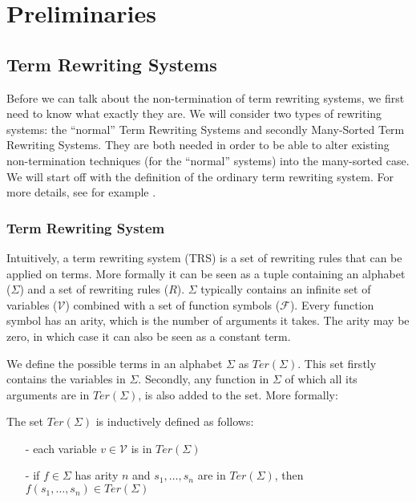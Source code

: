 \chapter{Preliminaries}\label{preliminaries}
\section{Term Rewriting Systems}
Before we can talk about the non-termination of term rewriting systems, we first need to know what exactly they are. We will consider two types of rewriting systems: the ``normal'' Term Rewriting Systems and secondly Many-Sorted Term Rewriting Systems. They are both needed in order to be able to alter existing non-termination techniques (for the ``normal'' systems) into the many-sorted case. We will start off with the definition of the ordinary term rewriting system. For more details, see for example \cite{Klop:1993:TRS:162552.162559}.
\subsection{Term Rewriting System}
Intuitively, a term rewriting system (TRS) is a set of rewriting rules that can be applied on terms. More formally it can be seen as a tuple containing an alphabet ($\Sigma$) and a set of rewriting rules ($R$). $\Sigma$ typically contains an infinite set of variables ($\mathcal{V}$) combined with a set of function symbols ($\mathcal{F}$). Every function symbol has an arity, which is the number of arguments it takes. The arity may be zero, in which case it can also be seen as a constant term.  

We define the possible terms in an alphabet $\Sigma$ as $\textit{Ter}\left(\Sigma\right)$. This set firstly contains the variables in $\Sigma$. Secondly, any function in $\Sigma$ of which all its arguments are in $\textit{Ter}\left(\Sigma\right)$, is also added to the set. More formally: 
\begin{definition}
The set $\textit{Ter}\left(\Sigma\right)$ is inductively defined as follows:
\begin{itemize}
    \itemsep -0.5em
    \item[-] each variable $v \in \mathcal{V}$ is in $\textit{Ter}\left(\Sigma\right)$
    \item[-] if $f \in \Sigma$ has arity $n$ and $s_1, \dots, s_n$ are in $\textit{Ter}\left(\Sigma\right)$, then $f(s_1, \dots, s_n) \in \textit{Ter}(\Sigma)$
\end{itemize}
\end{definition}

